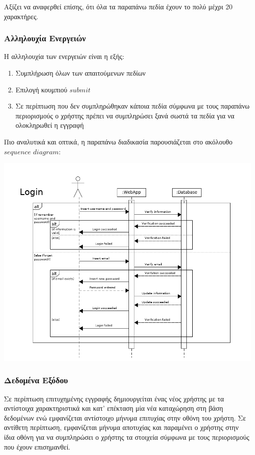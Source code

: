 \documentclass[12pt]{article}
\begin{document}
Αξίζει να αναφερθεί επίσης, ότι όλα τα παραπάνω πεδία έχουν το πολύ μέχρι 20 χαρακτήρες.

\subsubsection{Αλληλουχία Ενεργειών}

Η αλληλουχία των ενεργειών είναι η εξής:

\begin{enumerate}
\item Συμπλήρωση όλων των απαιτούμενων πεδίων
\item Επιλογή κουμπιού $submit$
\item Σε περίπτωση που δεν συμπληρώθηκαν κάποια πεδία σύμφωνα με τους παραπάνω περιορισμούς ο χρήστης πρέπει να συμπληρώσει ξανά σωστά τα πεδία για να ολοκληρωθεί η εγγραφή
\end{enumerate}

Πιο αναλυτικά και οπτικά, η παραπάνω διαδικασία παρουσιάζεται στο ακόλουθο $sequence$ $diagram$:


\begin{center}
\includegraphics[scale=0.5]{UML/loginSequence.png}
\end{center}

\subsubsection{Δεδομένα Εξόδου}

Σε περίπτωση επιτυχημένης εγγραφής δημιουργείται ένας νέος χρήστης με τα αντίστοιχα χαρακτηριστικά και κατ' επέκταση μία νέα καταχώρηση στη βάση δεδομένων ενώ εμφανίζεται αντίστοιχο μήνυμα επιτυχίας στην οθόνη του χρήστη. Σε αντίθετη περίπτωση, εμφανίζεται μήνυμα αποτυχίας και παραμένει ο χρήστης στην ίδια οθόνη για να συμπληρώσει ο χρήστης τα στοιχεία σύμφωνα με τους περιορισμούς που έχουν επισημανθεί.
\end{document}
